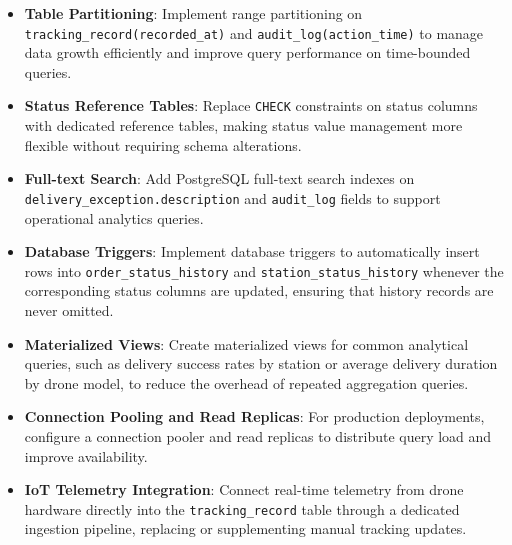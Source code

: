 \begin{itemize}
    \item \textbf{Table Partitioning}: Implement range partitioning on \texttt{tracking\_record(recorded\_at)} and \texttt{audit\_log(action\_time)} to manage data growth efficiently and improve query performance on time-bounded queries.
    \item \textbf{Status Reference Tables}: Replace \texttt{CHECK} constraints on status columns with dedicated reference tables, making status value management more flexible without requiring schema alterations.
    \item \textbf{Full-text Search}: Add PostgreSQL full-text search indexes on \texttt{delivery\_exception.description} and \texttt{audit\_log} fields to support operational analytics queries.
    \item \textbf{Database Triggers}: Implement database triggers to automatically insert rows into \texttt{order\_status\_history} and \texttt{station\_status\_history} whenever the corresponding status columns are updated, ensuring that history records are never omitted.
    \item \textbf{Materialized Views}: Create materialized views for common analytical queries, such as delivery success rates by station or average delivery duration by drone model, to reduce the overhead of repeated aggregation queries.
    \item \textbf{Connection Pooling and Read Replicas}: For production deployments, configure a connection pooler and read replicas to distribute query load and improve availability.
    \item \textbf{IoT Telemetry Integration}: Connect real-time telemetry from drone hardware directly into the \texttt{tracking\_record} table through a dedicated ingestion pipeline, replacing or supplementing manual tracking updates.
\end{itemize}
